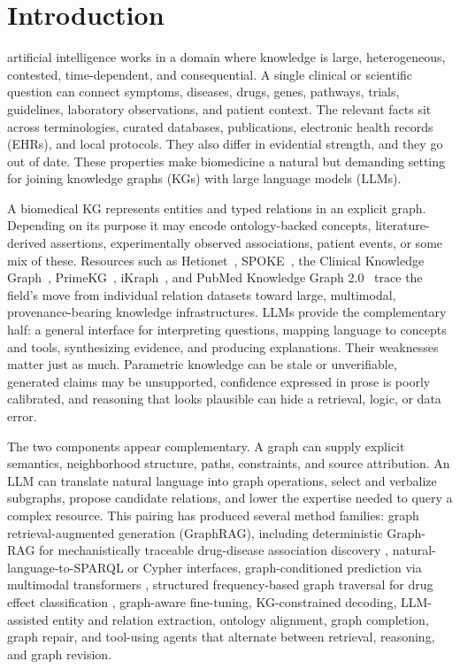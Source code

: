 \section{Introduction}

 artificial intelligence works in a domain where knowledge is large, heterogeneous, contested, time-dependent, and consequential. A single clinical or scientific question can connect symptoms, diseases, drugs, genes, pathways, trials, guidelines, laboratory observations, and patient context. The relevant facts sit across terminologies, curated databases, publications, electronic health records (EHRs), and local protocols. They also differ in evidential strength, and they go out of date. These properties make biomedicine a natural but demanding setting for joining knowledge graphs (KGs) with large language models (LLMs).

A biomedical KG represents entities and typed relations in an explicit graph. Depending on its purpose it may encode ontology-backed concepts, literature-derived assertions, experimentally observed associations, patient events, or some mix of these. Resources such as Hetionet~\cite{himmelstein2017hetionet}, SPOKE~\cite{morris2023spoke}, the Clinical Knowledge Graph~\cite{santos2022ckg}, PrimeKG~\cite{chandak2023primekg}, iKraph~\cite{zhang2025ikraph}, and PubMed Knowledge Graph 2.0~\cite{xu2025pubmedkg} trace the field's move from individual relation datasets toward large, multimodal, provenance-bearing knowledge infrastructures. LLMs provide the complementary half: a general interface for interpreting questions, mapping language to concepts and tools, synthesizing evidence, and producing explanations. Their weaknesses matter just as much. Parametric knowledge can be stale or unverifiable, generated claims may be unsupported, confidence expressed in prose is poorly calibrated, and reasoning that looks plausible can hide a retrieval, logic, or data error.

The two components appear complementary. A graph can supply explicit semantics, neighborhood structure, paths, constraints, and source attribution. An LLM can translate natural language into graph operations, select and verbalize subgraphs, propose candidate relations, and lower the expertise needed to query a complex resource.
This pairing has produced several method families: graph retrieval-augmented generation (GraphRAG), including deterministic Graph-RAG for mechanistically traceable drug-disease association discovery \cite{pramanik2026mechanistic}, natural-language-to-SPARQL or Cypher interfaces, graph-conditioned prediction via multimodal transformers \cite{das2025drugmap}, structured frequency-based graph traversal for drug effect classification \cite{chanda2026drugeffect}, graph-aware fine-tuning, KG-constrained decoding, LLM-assisted entity and relation extraction, ontology alignment, graph completion, graph repair, and tool-using agents that alternate between retrieval, reasoning, and graph revision.


